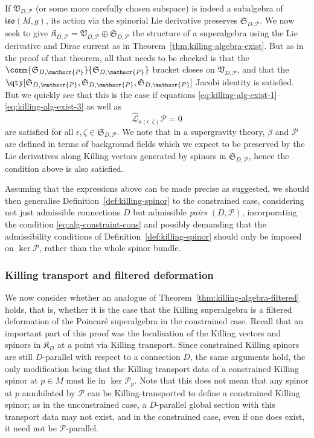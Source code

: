 \documentclass[10pt,a4paper]{amsart}
\numberwithin{equation}{section}
\newcommand{\fiso}{\mathfrak{iso}}
\newcommand{\fK}{\mathfrak{K}}
\newcommand{\fS}{\mathfrak{S}}
\newcommand{\fV}{\mathfrak{V}}
\newcommand{\eL}{\mathscr{L}}
\newcommand{\eP}{\mathscr{P}}
\newcommand{\eLhat}{\widehat{\eL}}
\newcommand{\1}{\mathbbm{1}}
\begin{document}
If $\fV_{D,\eP}$ (or some more carefully chosen subspace) is indeed a subalgebra of $\fiso(M,g)$, its action via the spinorial Lie derivative preserves $\fS_{D,\eP}$.
We now seek to give $\fK_{D,\eP} = \fV_{D,\eP}\oplus\fS_{D,\eP}$ the structure of a superalgebra using the Lie derivative and Dirac current as in Theorem~\ref{thm:killing-algebra-exist}. But as in the proof of that theorem, all that needs to be checked is that the $\comm{\fS_{D,\eP}}{\fS_{D,\eP}}$ bracket closes on $\fV_{D,\eP}$, and that the $\qty[\fS_{D,\eP},\fS_{D,\eP},\fS_{D,\eP}]$ Jacobi identity is satisfied. But we quickly see that this is the case if equations \eqref{eq:killing-alg-exist-1}--\eqref{eq:killing-alg-exist-3} as well as
\begin{equation}\label{eq:alg-constraint-cons}
	\eLhat_{\kappa(\epsilon,\zeta)}\eP = 0
\end{equation}
are satisfied for all $\epsilon,\zeta\in\fS_{D,\eP}$. We note that in a supergravity theory, $\beta$ and $\eP$ are defined in terms of background fields which we expect to be preserved by the Lie derivatives along Killing vectors generated by spinors in $\fS_{D,\eP}$, hence the condition above is also satisfied.

Assuming that the expressions above can be made precise as suggested, we should then generalise Definition~\ref{def:killing-spinor} to the constrained case, considering not just admissible connections $D$ but admissible \emph{pairs} $(D,\eP)$, incorporating the condition \eqref{eq:alg-constraint-cons} and possibly demanding that the admissibility conditions of Definition~\ref{def:killing-spinor} should only be imposed on $\ker\eP$, rather than the whole spinor bundle.

\subsubsection{Killing transport and filtered deformation}

We now consider whether an analogue of Theorem~\ref{thm:killing-algebra-filtered} holds, that is, whether it is the case that the Killing superalgebra is a filtered deformation of the Poincar\'e superalgebra in the constrained case. Recall that an important part of this proof was the localisation of the Killing vectors and spinors in $\fK_D$ at a point via Killing transport. Since constrained Killing spinors are still $D$-parallel with respect to a connection $D$, the same arguments hold, the only modification being that the Killing transport data of a constrained Killing spinor at $p\in M$ must lie in $\ker\eP_p$. Note that this does not mean that any spinor at $p$ annihilated by $\eP$ can be Killing-transported to define a constrained Killing spinor; as in the unconstrained case, a $D$-parallel global section with this transport data may not exist, and in the constrained case, even if one does exist, it need not be $\eP$-parallel.
\end{document}
